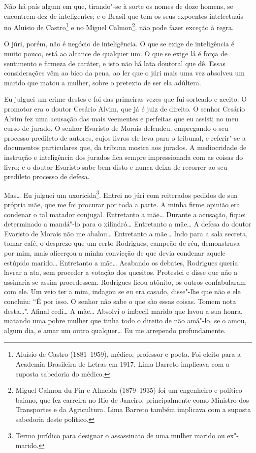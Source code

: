 Não há país algum em que, tirando"-se à sorte os nomes de doze homens, se
encontrem dez de inteligentes; e o Brasil que tem os seus expoentes
intelectuais no Aluísio de Castro\footnote{Aluísio de Castro (1881--1959), médico, professor e poeta. Foi eleito para a Academia
  Brasileira de Letras em 1917. Lima Barreto implicava com a suposta
  sabedoria do médico.} e no Miguel Calmon\footnote{Miguel Calmon du Pin
  e Almeida (1879--1935) foi um engenheiro e político baiano, que fez
  carreira no Rio de Janeiro, principalmente como Ministro dos
  Transportes e da Agricultura. Lima Barreto também implicava com a
  suposta sabedoria deste político.}, não pode fazer exceção à regra.

O júri, porém, não é negócio de inteligência. O que se exige de
inteligência é muito pouco, está ao alcance de qualquer um. O que se
exige lá é força de sentimento e firmeza de caráter, e isto não há lata
doutoral que dê. Essas considerações vêm ao bico da pena, ao ler que o
júri mais uma vez absolveu um marido que matou a mulher, sobre o
pretexto de ser ela adúltera.

Eu julguei um crime destes e foi das primeiras vezes que fui sorteado e
aceito. O promotor era o doutor Cesário Alvim, que já é juiz de direito.
O senhor Cesário Alvim fez uma acusação das mais veementes e perfeitas
que eu assisti no meu curso de jurado. O senhor Evaristo de Morais
defendeu, empregando o seu processo predileto de autores, cujos livros
ele leva para o tribunal, e referir"-se a documentos particulares que, da
tribuna mostra aos jurados. A mediocridade de instrução e inteligência
dos jurados fica sempre impressionada com as coisas do livro; e o doutor
Evaristo sabe bem disto e nunca deixa de recorrer ao seu predileto
processo de defesa.

Mas\ldots{} Eu julguei um uxoricida\footnote{Termo jurídico para
  designar o assassinato de uma mulher marido ou ex"-marido.}. Entrei no
júri com reiterados pedidos de sua própria mãe, que me foi procurar por
toda a parte. A minha firme opinião era condenar o tal matador conjugal.
Entretanto a mãe\ldots{} Durante a acusação, fiquei determinado a
mandá"-lo para o xilindró\ldots{} Entretanto a mãe\ldots{} A defesa do
doutor Evaristo de Morais não me abalou\ldots{} Entretanto a mãe\ldots{}
Indo para a sala secreta, tomar café, o desprezo que um certo Rodrigues,
campeão de réu, demonstrava por mim, mais alicerçou a minha convicção de
que devia condenar aquele estúpido marido\ldots{} Entretanto a
mãe\ldots{} Acabando os debates, Rodrigues queria lavrar a ata, sem
proceder a votação dos quesitos. Protestei e disse que não a assinaria
se assim procedessem. Rodrigues ficou atônito, os outros confabularam
com ele. Um veio ter a mim, indagou se eu era casado, disse"-lhe que não
e ele concluiu: ``É por isso. O senhor não sabe o que são essas coisas.
Tomem nota desta\ldots{}''. Afinal cedi\ldots{} A mãe\ldots{} Absolvi o
imbecil marido que lavou a sua honra, matando uma pobre mulher que tinha
todo o direito de não amá"-lo, se o amou, algum dia, e amar um outro
qualquer\ldots{} Eu me arrependo profundamente.



